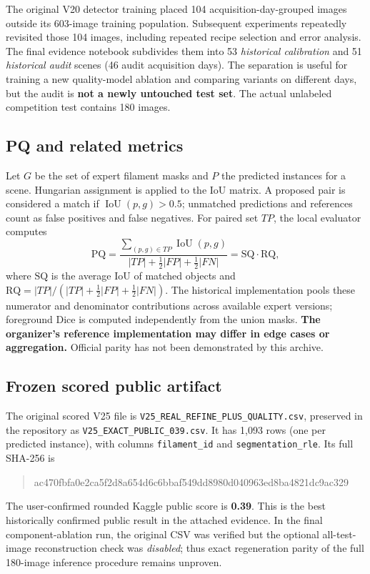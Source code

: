 \documentclass[11pt,a4paper]{article}
\newcommand{\PQ}{\mathrm{PQ}}\newcommand{\SQ}{\mathrm{SQ}}\newcommand{\RQ}{\mathrm{RQ}}
\begin{document}
The original V20 detector training placed 104 acquisition-day-grouped images outside its 603-image training population. Subsequent experiments repeatedly revisited those 104 images, including repeated recipe selection and error analysis. The final evidence notebook subdivides them into 53 \emph{historical calibration} and 51 \emph{historical audit} scenes (46 audit acquisition days). The separation is useful for training a new quality-model ablation and comparing variants on different days, but the audit is \textbf{not a newly untouched test set}. The actual unlabeled competition test contains 180 images.

\subsection{PQ and related metrics}
Let $G$ be the set of expert filament masks and $P$ the predicted instances for a scene. Hungarian assignment is applied to the IoU matrix. A proposed pair is considered a match if $\operatorname{IoU}(p,g)>0.5$; unmatched predictions and references count as false positives and false negatives. For paired set $TP$, the local evaluator computes
\begin{equation}
\PQ=\frac{\sum_{(p,g)\in TP}\operatorname{IoU}(p,g)}{|TP|+\tfrac{1}{2}|FP|+\tfrac{1}{2}|FN|}=\SQ\cdot\RQ,
\end{equation}
where $\SQ$ is the average IoU of matched objects and $\RQ=|TP|/(|TP|+\tfrac12|FP|+\tfrac12|FN|)$. The historical implementation pools these numerator and denominator contributions across available expert versions; foreground Dice is computed independently from the union masks. \textbf{The organizer's reference implementation may differ in edge cases or aggregation.} Official parity has not been demonstrated by this archive.

\subsection{Frozen scored public artifact}
The original scored V25 file is \texttt{V25\_REAL\_REFINE\_PLUS\_QUALITY.csv}, preserved in the repository as \texttt{V25\_EXACT\_PUBLIC\_039.csv}. It has 1,093 rows (one per predicted instance), with columns \texttt{filament\_id} and \texttt{segmentation\_rle}. Its full SHA-256 is
\begin{quote}\small\ttfamily ac470fbfa0e2ca5f2d8a654d6c6bbaf549dd8980d040963ed8ba4821dc9ac329\end{quote}
The user-confirmed rounded Kaggle public score is \textbf{0.39}. This is the best historically confirmed public result in the attached evidence. In the final component-ablation run, the original CSV was verified but the optional all-test-image reconstruction check was \emph{disabled}; thus exact regeneration parity of the full 180-image inference procedure remains unproven.
\end{document}
